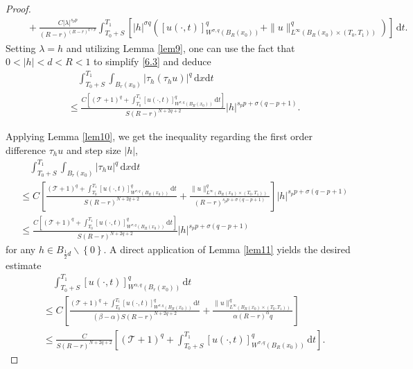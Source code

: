 \documentclass[reqno,10pt]{amsart}
\numberwithin{equation}{section}
\begin{document}
\begin{proof}
\begin{align}
		&\quad+\frac{C|\lambda|^{s_pp}}{(R-r)^{(R-r)^{q+p}}}\int_{T_0+S}^{T_1}\left[|h|^{\sigma q}\left([u(\cdot,t)]^q_{W^{\sigma,q}(B_R(x_0))}+\|u\|^q_{L^\infty\left( B_{R}(x_0)\times(T_0,T_1)\right) }\right)\right]\,\mathrm{d}t.
	\end{align}
	Setting $\lambda=h$ and utilizing Lemma \ref{lem9}, one can use the fact that $0<|h|<d<R<1$ to simplify \eqref{6.3} and deduce
	\begin{align}
		\label{6.4}
	&\quad	\int_{T_0+S}^{T_1}\int_{B_r(x_0)}\left|\tau_h(\tau_hu)\right|^q\,\mathrm{d}x\mathrm{d}t\nonumber\\
		&\le \frac{C\left[\left( \mathcal{T}+1\right)^q+\int_{T_0}^{T_1}[u(\cdot,t)]^q_{W^{\sigma,q}\left(B_R(x_0)\right)}\,\mathrm{d}t\right]}{S(R-r)^{N+2q+2}}|h|^{s_pp+\sigma(q-p+1)}.
	\end{align}
	
	Applying Lemma \ref{lem10}, we get the inequality regarding the first order difference $\tau_hu$ and step size $|h|$,
	\begin{align*}
		&\quad\int_{T_0+S}^{T_1}\int_{B_r(x_0)}|\tau_hu|^q\,\mathrm{d}x\mathrm{d}t\\
		&\le C\left[\frac{\left( \mathcal{T}+1\right)^q+\int_{T_0}^{T_1}[u(\cdot,t)]^q_{W^{\sigma,q}\left(B_R(x_0)\right)}\,\mathrm{d}t}{S(R-r)^{N+2q+2}}+\frac{\|u\|^q_{L^\infty\left(B_R(x_0)\times(T_0,T_1)\right) }}{(R-r)^{s_pp+\sigma(q-p+1)}}\right]|h|^{s_pp+\sigma(q-p+1)}\\
		&\le\frac{C\left[\left( \mathcal{T}+1\right)^q+\int_{T_0}^{T_1}[u(\cdot,t)]^q_{W^{\sigma,q}\left(B_R(x_0)\right)}\,\mathrm{d}t\right] }{S(R-r)^{N+2q+2}}|h|^{s_pp+\sigma(q-p+1)}
	\end{align*}
	for any $h\in B_{\frac{1}{2}d}\backslash\left\lbrace 0\right\rbrace$. A direct application of Lemma \ref{lem11} yields the desired estimate
	\begin{align*}
		&\quad\int_{T_0+S}^{T_1}[u(\cdot,t)]^q_{W^{\alpha,q}(B_r(x_0))}\,\mathrm{d}t\\
		&\le C\left[ \frac{\left( \mathcal{T}+1\right)^q+\int_{T_0}^{T_1}[u(\cdot,t)]^q_{W^{\sigma,q}\left(B_R(x_0)\right)}\,\mathrm{d}t}{(\beta-\alpha)S(R-r)^{N+2q+2}}+\frac{\|u\|^q_{L^\infty\left(B_R(x_0)\times(T_0,T_1)\right) }}{\alpha(R-r)^\alpha q}\right]\\
		&\le \frac{C}{S(R-r)^{N+2q+2}}\left[\left(\mathcal{T}+1\right)^q+\int_{T_0+S}^{T_1}[u(\cdot,t)]^q_{W^{\sigma,q}(B_R(x_0))}\,\mathrm{d}t\right].
	\end{align*}
\end{proof}
\end{document}

